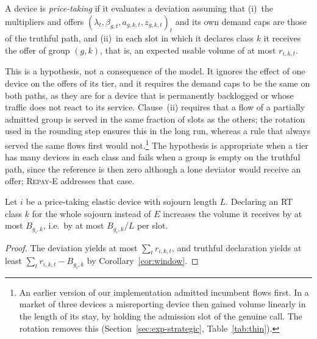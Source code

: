 \begin{definition}\label{def:pt}
A device is \emph{price-taking} if it evaluates a deviation assuming that (i)~the multipliers and offers $(\lambda_t,\beta_{g,t},a_{g,k,t},z_{g,k,t})_t$ and its own demand caps are those of the truthful path, and (ii)~in each slot in which it declares class $k$ it receives the offer of group $(g,k)$, that is, an expected usable volume of at most $r_{i,k,t}$.
\end{definition}

This is a hypothesis, not a consequence of the model.
It ignores the effect of one device on the offers of its tier, and it requires the demand caps to be the same on both paths, as they are for a device that is permanently backlogged or whose traffic does not react to its service.
Clause~(ii) requires that a flow of a partially admitted group is served in the same fraction of slots as the others; the rotation used in the rounding step ensures this in the long run, whereas a rule that always served the same flows first would not.\footnote{An earlier version of our implementation admitted incumbent flows first. In a market of three devices a misreporting device then gained volume linearly in the length of its stay, by holding the admission slot of the genuine call. The rotation removes this (Section~\ref{sec:exp-strategic}, Table~\ref{tab:thin}).}
The hypothesis is appropriate when a tier has many devices in each class and fails when a group is empty on the truthful path, since the reference is then zero although a lone deviator would receive an offer; \textsc{Repay-E} addresses that case.

\begin{theorem}\label{thm:static}
Let $i$ be a price-taking elastic device with sojourn length $L$.
Declaring an RT class $k$ for the whole sojourn instead of $E$ increases the volume it receives by at most $B_{g_i,k}$, i.e.\ by at most $B_{g_i,k}/L$ per slot.
\end{theorem}
\begin{proof}
The deviation yields at most $\sum_t r_{i,k,t}$, and truthful declaration yields at least $\sum_t r_{i,k,t}-B_{g_i,k}$ by Corollary~\ref{cor:window}.
\end{proof}

